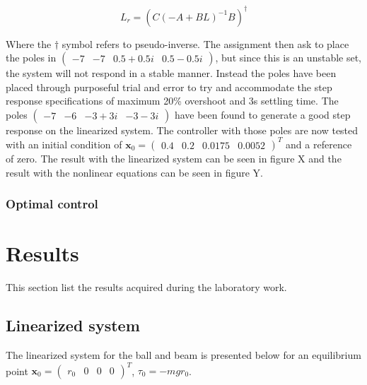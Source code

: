 \documentclass[a4paper, titlepage]{article}
\begin{document}
\begin{equation}
L_r = (C(-A + BL)^{-1}B)^{\dagger}
\end{equation}

Where the $\dagger$ symbol refers to pseudo-inverse.
The assignment then ask to place the poles in $\begin{pmatrix} -7 & -7 & 0.5+0.5i & 0.5-0.5i \end{pmatrix}$, but since this is an unstable set, the system will not respond in a stable manner.
Instead the poles have been placed through purposeful trial and error to try and accommodate the step response specifications of maximum 20\% overshoot and 3s settling time.
The poles $\begin{pmatrix} -7 & -6 & -3+3i & -3-3i \end{pmatrix}$ have been found to generate a good step response on the linearized system.
The controller with those poles are now tested with an initial condition of $\textbf{x}_0 = \begin{pmatrix} 0.4 & 0.2 & 0.0175 & 0.0052 \end{pmatrix}^T$ and a reference of zero.
The result with the linearized system can be seen in figure X and the result with the nonlinear equations can be seen in figure Y.


\subsubsection{Optimal control}




















\section{Results}
This section list the results acquired during the laboratory work.

\subsection{Linearized system}
The linearized system for the ball and beam is presented below for an equilibrium point $\textbf{x}_0 = \begin{pmatrix} r_0 & 0 & 0 & 0 \end{pmatrix}^T$, $\tau_0 = -mgr_0$.
\end{document}
